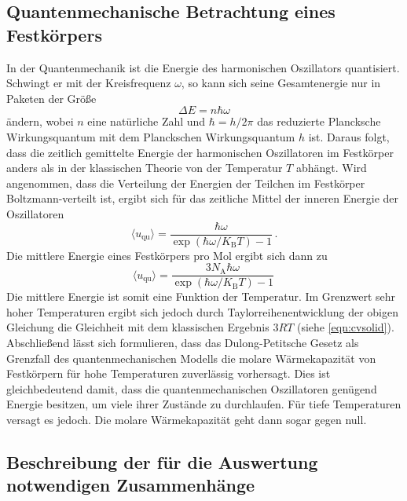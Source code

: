 \subsection{Quantenmechanische Betrachtung eines Festkörpers}
In der Quantenmechanik ist die Energie des harmonischen Oszillators quantisiert.
Schwingt er mit der Kreisfrequenz $\omega$, so kann sich seine Gesamtenergie
nur in Paketen der Größe
\begin{equation}
  \Delta E = n \hbar \omega
  \label{eqn:equantum}
\end{equation}
ändern, wobei $n$ eine natürliche Zahl und $\hbar = h / 2 \pi$ das reduzierte Plancksche
Wirkungsquantum mit dem Planckschen Wirkungsquantum $h$ ist. Daraus folgt, dass
die zeitlich gemittelte Energie der harmonischen Oszillatoren im Festkörper
anders als in der klassischen Theorie von der Temperatur $T$ abhängt. Wird angenommen,
dass die Verteilung der Energien der Teilchen im Festkörper Boltzmann-verteilt ist,
ergibt sich für das zeitliche Mittel der inneren Energie der Oszillatoren
\begin{equation}
  \langle u_\text{qu} \rangle = \frac{\hbar \omega}{\exp(\hbar \omega / K_\text{B} T) - 1}\,.
  \label{eqn:uqu}
\end{equation}
Die mittlere Energie eines Festkörpers pro Mol ergibt sich dann zu
\begin{equation}
  \langle u_\text{qu} \rangle = \frac{3 N_\text{A} \hbar \omega}{\exp(\hbar \omega / K_\text{B} T) - 1}\,
  \label{eqn:uqu}
\end{equation}
Die mittlere Energie ist somit eine Funktion der Temperatur. Im Grenzwert sehr hoher
Temperaturen ergibt sich jedoch durch Taylorreihenentwicklung der obigen Gleichung
die Gleichheit mit dem klassischen Ergebnis $3 R T$ (siehe \eqref{eqn:cvsolid}). \newline
Abschließend lässt sich formulieren, dass das Dulong-Petitsche Gesetz als Grenzfall
des quantenmechanischen Modells die molare Wärmekapazität von Festkörpern für hohe
Temperaturen zuverlässig vorhersagt. Dies ist gleichbedeutend damit, dass die quantenmechanischen
Oszillatoren genügend Energie besitzen, um viele ihrer Zustände zu durchlaufen.
Für tiefe Temperaturen versagt es jedoch. Die molare Wärmekapazität geht dann sogar gegen
null.

\subsection{Beschreibung der für die Auswertung notwendigen Zusammenhänge}

